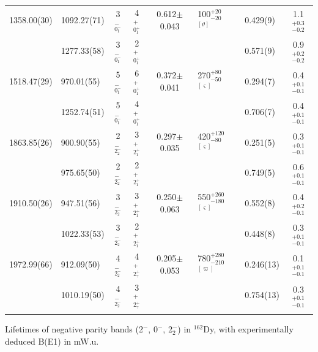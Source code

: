 \begin{landscape}
\begin{center}
\begin{longtable}{llcccllc}
 1358.00(30) & 1092.27(71)               & 3$^-_{0^-_1}$      & 4$^+_{0^+_1}$ &0.612$\pm$0.043& 100$^{+20}_{-20}$ $^{[\vartheta]}$             & 0.429(9)             & 1.1$^{+0.3}_{-0.2}$ \\ 
             & 1277.33(58)               & 3$^-_{0^-_1}$      & 2$^+_{0^+_1}$ &&                                                            & 0.571(9)             & 0.9$^{+0.2}_{-0.2}$  \\ 
 1518.47(29)&   970.01(55)               & 5$^-_{0^-_1}$ & 6$^+_{0^+_1}$      &0.372$\pm$0.041& 270$^{+80}_{-50}$ $^{[\varsigma]}$              &0.294(7)              & 0.4$^{+0.1}_{-0.1}$         \\
            &  1252.74(51)               & 5$^-_{0^-_1}$ & 4$^+_{0^+_1}$      &&                                                            &0.706(7)              & 0.4$^{+0.1}_{-0.1}$         \\ \hline
 1863.85(26)&   900.90(55)               & 2$^-_{2^-_2}$ & 3$^+_{2^+_1}$      &0.297$\pm$0.035& 420$^{+120}_{-80}$ $^{[\varsigma]}$             &0.251(5)              & 0.3$^{+0.1}_{-0.1}$        \\
            &   975.65(50)               & 2$^-_{2^-_2}$ & 2$^+_{2^+_1}$      &&                                                            &0.749(5)              & 0.6$^{+0.1}_{-0.1}$        \\ 
 1910.50(26)&   947.51(56)               & 3$^-_{2^-_2}$ & 3$^+_{2^+_1}$      &0.250$\pm$0.063& 550$^{+260}_{-180}$ $^{[\varsigma]}$            &0.552(8)              & 0.4$^{+0.2}_{-0.1}$         \\
            &  1022.33(53)               & 3$^-_{2^-_2}$ & 2$^+_{2^+_1}$      &&                                                            &0.448(8)              & 0.3$^{+0.1}_{-0.1}$        \\ 
 1972.99(66)&   912.09(50)               & 4$^-_{2^-_2}$ & 4$^+_{2^+_\gamma}$ &0.205$\pm$0.053& 780$^{+280}_{-210}$    $^{[\varpi]}$       &0.246(13)             & 0.1$^{+0.1}_{-0.1}$\\            
            &  1010.19(50)               & 4$^-_{2^-_2}$ & 3$^+_{2^+_\gamma}$ &&                                                            &0.754(13)             & 0.3$^{+0.1}_{-0.1}$\\ \hline  
\\
\end{longtable}
\end{center}
Lifetimes of negative parity bands (2$^-$, 0$^-$, 2$^-_2$) in $^{162}$Dy, with experimentally deduced B(E1) in mW.u.\\

\end{landscape}
